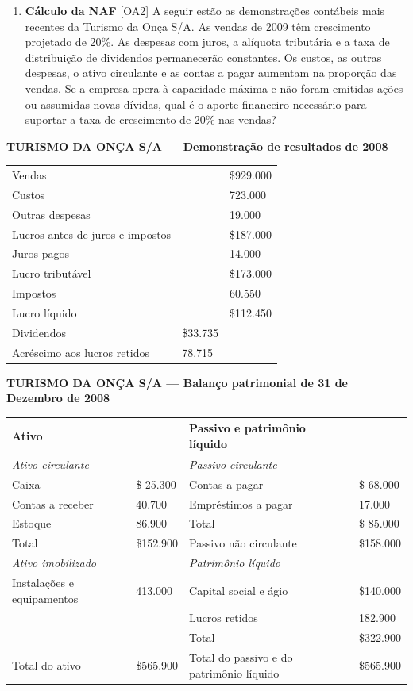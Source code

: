 \documentclass[11pt,a4paper]{article}
\providecommand{\tightlist}{\setlength{\itemsep}{0pt}\setlength{\parskip}{0pt}}
\begin{document}
\begin{enumerate}
\def\labelenumi{\arabic{enumi}.}
\setcounter{enumi}{24}
\tightlist
\item
  \textbf{Cálculo da NAF} {[}OA2{]} A seguir estão as demonstrações contábeis mais recentes da
  Turismo da Onça S/A. As vendas de 2009 têm crescimento projetado de 20\%. As despesas com juros, a
  alíquota tributária e a taxa de distribuição de dividendos permanecerão constantes. Os custos, as
  outras despesas, o ativo circulante e as contas a pagar aumentam na proporção das vendas. Se a
  empresa opera à capacidade máxima e não foram emitidas ações ou assumidas novas dívidas, qual é o
  aporte financeiro necessário para suportar a taxa de crescimento de 20\% nas vendas?
\end{enumerate}

\textbf{TURISMO DA ONÇA S/A --- Demonstração de resultados de 2008}

{\def\LTcaptype{none} %
\begin{longtable}[]{@{}lll@{}}
\toprule\noalign{}
\endhead
\bottomrule\noalign{}
\endlastfoot
Vendas & & \$929.000 \\
Custos & & 723.000 \\
Outras despesas & & 19.000 \\
Lucros antes de juros e impostos & & \$187.000 \\
Juros pagos & & 14.000 \\
Lucro tributável & & \$173.000 \\
Impostos & & 60.550 \\
Lucro líquido & & \$112.450 \\
Dividendos & \$33.735 & \\
Acréscimo aos lucros retidos & 78.715 & \\
\end{longtable}
}

\textbf{TURISMO DA ONÇA S/A --- Balanço patrimonial de 31 de Dezembro de 2008}

{\def\LTcaptype{none} %
\begin{longtable}[]{@{}llll@{}}
\toprule\noalign{}
Ativo & & Passivo e patrimônio líquido & \\
\midrule\noalign{}
\endhead
\bottomrule\noalign{}
\endlastfoot
\emph{Ativo circulante} & & \emph{Passivo circulante} & \\
Caixa & \$ 25.300 & Contas a pagar & \$ 68.000 \\
Contas a receber & 40.700 & Empréstimos a pagar & 17.000 \\
Estoque & 86.900 & Total & \$ 85.000 \\
Total & \$152.900 & Passivo não circulante & \$158.000 \\
\emph{Ativo imobilizado} & & \emph{Patrimônio líquido} & \\
Instalações e equipamentos & 413.000 & Capital social e ágio & \$140.000 \\
& & Lucros retidos & 182.900 \\
& & Total & \$322.900 \\
Total do ativo & \$565.900 & Total do passivo e do patrimônio líquido & \$565.900 \\
\end{longtable}
}
\end{document}
